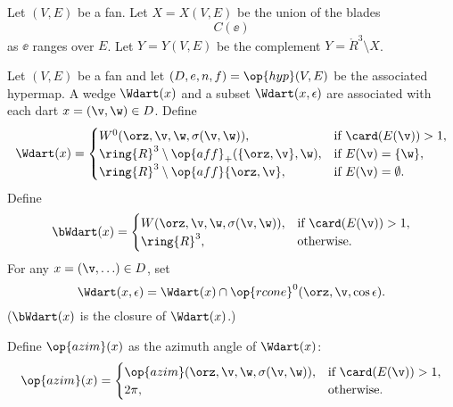 \begin{definition}[X,~Y]\label{def:XY}
Let $(V,E)$ be a fan.  Let $X=X(V,E)$ be the union of the
blades
\[ C(\ee)\] 
as $\ee$ ranges over $E$.  Let $Y=Y(V,E)$ be the complement
$Y = \ring{R}^3\setminus X$.
%
%
\end{definition}

\begin{definition}[$\Wdart$,~$\bWdart$]
Let $(V,E)$ be a fan and let $(D,e,n,f) = \op{hyp}(V,E)$
be the associated hypermap.  
A wedge $\Wdart(x)$ and a subset $\Wdart(x,\epsilon)$ are associated with
 each dart $x=(\v,\w)\in D$.  Define 
%
%
%
%
%
%
%
%
%
\[ 
\Wdart(x)=
\begin{cases} 
W^0(\orz,\v,\w,\sigma(\v,\w)),&\text{if }\card(E(\v))>1,\\
\ring{R}^3\setminus \op{aff}_+(\{\orz,\v\},\w),&\text{if } E(\v) = \{\w\},\\
\ring{R}^3\setminus \op{aff}\{\orz,\v\},&\text{if } E(\v) = \emptyset.\\
\end{cases}
\] 
Define
\[ 
\bWdart(x) = 
\begin{cases} 
W(\orz,\v,\w,\sigma(\v,\w)),&\text{if }\card(E(\v))>1,\\
\ring{R}^3,&\text{otherwise}.\\
\end{cases}
\] 
For any $x = (\v,\ldots)\in D$, set
\[ 
\Wdart(x,\epsilon) = \Wdart(x) \cap \op{rcone}^0(\orz,\v,\cos\epsilon).
\] 
%
($\bWdart(x)$ is the closure of $\Wdart(x)$.)
\end{definition}

\begin{definition}[$\op{azim}$]
Define $\op{azim}(x)$ as the azimuth angle of $\Wdart(x)$:
%
\[ 
\op{azim}(x)=\begin{cases}
\op{azim}(\orz,\v,\w,\sigma(\v,\w)), &\text{if } \card(E(\v)) > 1,\\
2\pi, & \text{otherwise.}\\
\end{cases}
\] 
\end{definition}

